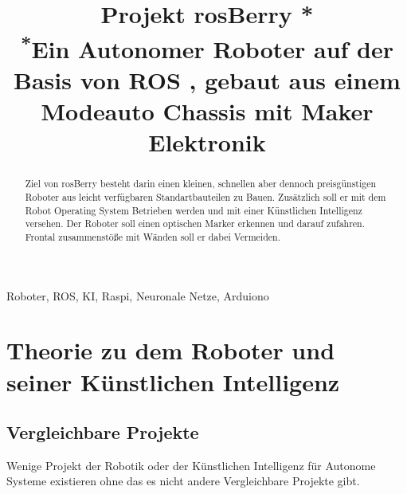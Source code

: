 \documentclass[conference]{IEEEtran}
\begin{document}
\title{Projekt rosBerry *\\
{\footnotesize \textsuperscript{*}Ein Autonomer Roboter auf der Basis von ROS , gebaut aus einem Modeauto Chassis mit Maker Elektronik}}

\author{
%
\and
{}
\and
{}
}

\maketitle

\begin{abstract}
Ziel von rosBerry besteht darin einen kleinen, schnellen aber dennoch preisgünstigen Roboter aus leicht verfügbaren Standartbauteilen zu Bauen. Zusätzlich soll er mit dem Robot Operating System Betrieben werden und mit einer Künstlichen Intelligenz versehen. Der Roboter soll einen optischen Marker erkennen und darauf zufahren. Frontal zusammenstöße mit Wänden soll er dabei Vermeiden. 
\end{abstract}

\begin{IEEEkeywords}
Roboter, ROS, KI, Raspi, Neuronale Netze, Arduiono
\end{IEEEkeywords}

\section{Theorie zu dem Roboter und seiner Künstlichen Intelligenz}

\subsection{Vergleichbare Projekte}	%
Wenige Projekt der Robotik oder der Künstlichen Intelligenz für Autonome Systeme  existieren ohne das es nicht andere Vergleichbare Projekte gibt. \\
\end{document}
